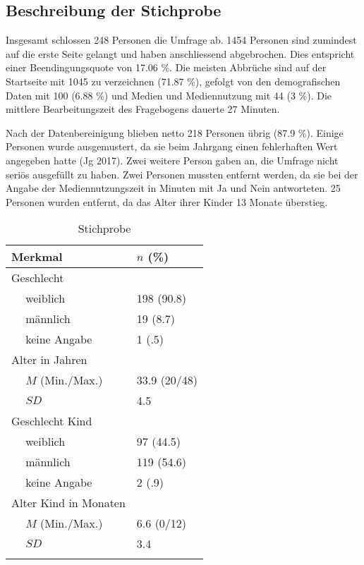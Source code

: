 \subsection{Beschreibung der Stichprobe}
Insgesamt schlossen 248 Personen die Umfrage ab. 1454 Personen sind zumindest auf die erste Seite gelangt und haben anschliessend abgebrochen. Dies entspricht einer Beendingungsquote von 17.06 \%. Die meisten Abbrüche sind auf der Startseite mit 1045 zu verzeichnen (71.87 \%), gefolgt von den demografischen Daten mit 100 (6.88 \%) und Medien und Mediennutzung mit 44 (3 \%). Die mittlere Bearbeitungszeit des Fragebogens dauerte 27 Minuten. 

Nach der Datenbereinigung blieben netto 218 Personen übrig (87.9 \%). Einige Personen wurde ausgemustert, da sie beim Jahrgang einen fehlerhaften Wert angegeben hatte (Jg 2017). Zwei weitere Person gaben an, die Umfrage nicht seriös ausgefüllt zu haben. Zwei Personen mussten entfernt werden, da sie bei der Angabe der Mediennutzungszeit in Minuten mit Ja und Nein antworteten. 25 Personen wurden entfernt, da das Alter ihrer Kinder 13 Monate überstieg. 

\begin{table}[hbtp]
\centering
\captionsetup{margin=110pt,skip=5pt}
\caption{Stichprobe}
\begin{tabular}{m{0.5em}  m{10em}  m{5em}} 
  \hline\hline
  \multicolumn{2}{l}{\textbf{Merkmal}} & \textbf{$n$ (\%)} \\
  \hline
  \multicolumn{2}{l}{Geschlecht} \\ 
   & weiblich & 198 (90.8)\\ 
   & männlich & 19 (8.7)\\ 
   & keine Angabe & 1 (.5)\\ 
   
  \multicolumn{2}{l}{Alter in Jahren} \\
   & $M$ (Min./Max.) & 33.9 (20/48) \\
   & $SD$ & 4.5 \\
  
  \multicolumn{2}{l}{Geschlecht Kind} \\
   & weiblich & 97 (44.5)\\ 
   & männlich & 119 (54.6)\\ 
   & keine Angabe & 2 (.9)\\
  
  \multicolumn{2}{l}{Alter Kind in Monaten} \\
   &  $M$ (Min./Max.) & 6.6 (0/12)\\
   & $SD$ & 3.4\\
  \hline\hline
  &&\\
\end{tabular}
\label{table:Stichprobe}
\end{table}

